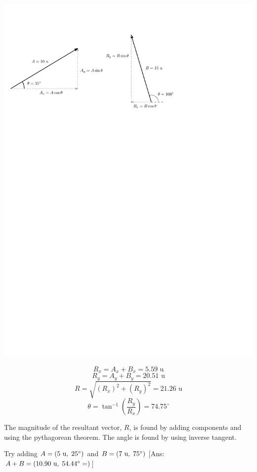 \documentclass[12pt]{report}
\newcommand{\un}{\mbox{ u}}
\begin{document}
\vspace{.1cm}

\hfill \includegraphics{vectors_35plus100} \hspace{3cm}

\hspace{2cm} \parbox{6cm}{$$R_x = A_x+B_x = 5.59 \un$$ $$R_y = A_y + B_y = 20.51 \un$$ $$R = \sqrt{(R_x)^2 + (R_y)^2} = 21.26 \un$$ $$\theta = \tan^{-1}(\frac{R_y}{R_x}) = 74.75^{\circ}$$} \hfill \parbox{6cm}{The magnitude of the resultant vector, $R$, is found by adding components and using the pythagorean theorem.  The angle is found by using inverse tangent.} \hspace{2cm}

\vfill

\hfill Try adding $A = (5 \un, \hspace{.1cm} 25^{\circ})$ and  $B = (7 \un, \hspace{.1cm} 75^{\circ})$ \hfill [Ans: $A+B =  (10.90 \un, \hspace{.1cm} 54.44^{\circ} = )$] \hfill \mbox{}
\end{document}
